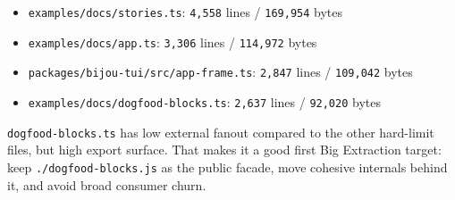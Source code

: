 \begin{itemize}
\tightlist
\item
  \texttt{e\allowbreak{}x\allowbreak{}a\allowbreak{}m\allowbreak{}p\allowbreak{}l\allowbreak{}e\allowbreak{}s\allowbreak{}/\allowbreak{}d\allowbreak{}o\allowbreak{}c\allowbreak{}s\allowbreak{}/\allowbreak{}s\allowbreak{}t\allowbreak{}o\allowbreak{}r\allowbreak{}i\allowbreak{}e\allowbreak{}s\allowbreak{}.\allowbreak{}t\allowbreak{}s}: \texttt{4\allowbreak{},\allowbreak{}5\allowbreak{}5\allowbreak{}8} lines / \texttt{1\allowbreak{}6\allowbreak{}9\allowbreak{},\allowbreak{}9\allowbreak{}5\allowbreak{}4} bytes
\item
  \texttt{e\allowbreak{}x\allowbreak{}a\allowbreak{}m\allowbreak{}p\allowbreak{}l\allowbreak{}e\allowbreak{}s\allowbreak{}/\allowbreak{}d\allowbreak{}o\allowbreak{}c\allowbreak{}s\allowbreak{}/\allowbreak{}a\allowbreak{}p\allowbreak{}p\allowbreak{}.\allowbreak{}t\allowbreak{}s}: \texttt{3\allowbreak{},\allowbreak{}3\allowbreak{}0\allowbreak{}6} lines / \texttt{1\allowbreak{}1\allowbreak{}4\allowbreak{},\allowbreak{}9\allowbreak{}7\allowbreak{}2} bytes
\item
  \texttt{p\allowbreak{}a\allowbreak{}c\allowbreak{}k\allowbreak{}a\allowbreak{}g\allowbreak{}e\allowbreak{}s\allowbreak{}/\allowbreak{}b\allowbreak{}i\allowbreak{}j\allowbreak{}o\allowbreak{}u\allowbreak{}-\allowbreak{}t\allowbreak{}u\allowbreak{}i\allowbreak{}/\allowbreak{}s\allowbreak{}r\allowbreak{}c\allowbreak{}/\allowbreak{}a\allowbreak{}p\allowbreak{}p\allowbreak{}-\allowbreak{}f\allowbreak{}r\allowbreak{}a\allowbreak{}m\allowbreak{}e\allowbreak{}.\allowbreak{}t\allowbreak{}s}: \texttt{2\allowbreak{},\allowbreak{}8\allowbreak{}4\allowbreak{}7} lines / \texttt{1\allowbreak{}0\allowbreak{}9\allowbreak{},\allowbreak{}0\allowbreak{}4\allowbreak{}2} bytes
\item
  \texttt{e\allowbreak{}x\allowbreak{}a\allowbreak{}m\allowbreak{}p\allowbreak{}l\allowbreak{}e\allowbreak{}s\allowbreak{}/\allowbreak{}d\allowbreak{}o\allowbreak{}c\allowbreak{}s\allowbreak{}/\allowbreak{}d\allowbreak{}o\allowbreak{}g\allowbreak{}f\allowbreak{}o\allowbreak{}o\allowbreak{}d\allowbreak{}-\allowbreak{}b\allowbreak{}l\allowbreak{}o\allowbreak{}c\allowbreak{}k\allowbreak{}s\allowbreak{}.\allowbreak{}t\allowbreak{}s}: \texttt{2\allowbreak{},\allowbreak{}6\allowbreak{}3\allowbreak{}7} lines / \texttt{9\allowbreak{}2\allowbreak{},\allowbreak{}0\allowbreak{}2\allowbreak{}0} bytes
\end{itemize}

\texttt{d\allowbreak{}o\allowbreak{}g\allowbreak{}f\allowbreak{}o\allowbreak{}o\allowbreak{}d\allowbreak{}-\allowbreak{}b\allowbreak{}l\allowbreak{}o\allowbreak{}c\allowbreak{}k\allowbreak{}s\allowbreak{}.\allowbreak{}t\allowbreak{}s} has low external fanout compared to the other hard-limit files, but high export surface. That makes it a good first Big Extraction target: keep \texttt{.\allowbreak{}/\allowbreak{}d\allowbreak{}o\allowbreak{}g\allowbreak{}f\allowbreak{}o\allowbreak{}o\allowbreak{}d\allowbreak{}-\allowbreak{}b\allowbreak{}l\allowbreak{}o\allowbreak{}c\allowbreak{}k\allowbreak{}s\allowbreak{}.\allowbreak{}j\allowbreak{}s} as the public facade, move cohesive internals behind it, and avoid broad consumer churn.


